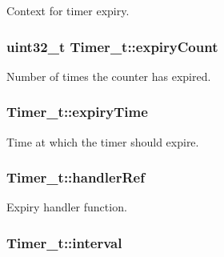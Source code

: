 Context for timer expiry. 

\subsubsection[{\texorpdfstring{expiry\+Count}{expiryCount}}]{\setlength{\rightskip}{0pt plus 5cm}uint32\+\_\+t Timer\+\_\+t\+::expiry\+Count}\hypertarget{struct_timer__t_abf372745a814acf0aaa7ad066617daac}{}\label{struct_timer__t_abf372745a814acf0aaa7ad066617daac}


Number of times the counter has expired. 

\subsubsection[{\texorpdfstring{expiry\+Time}{expiryTime}}]{ Timer\+\_\+t\+::expiry\+Time}\hypertarget{struct_timer__t_a69c227080ba546fd26bceef8977ec050}{}\label{struct_timer__t_a69c227080ba546fd26bceef8977ec050}


Time at which the timer should expire. 

\subsubsection[{\texorpdfstring{handler\+Ref}{handlerRef}}]{ Timer\+\_\+t\+::handler\+Ref}\hypertarget{struct_timer__t_aba3262b93cf1c2493362ffcb6d04d0d5}{}\label{struct_timer__t_aba3262b93cf1c2493362ffcb6d04d0d5}


Expiry handler function. 

\subsubsection[{\texorpdfstring{interval}{interval}}]{ Timer\+\_\+t\+::interval}\hypertarget{struct_timer__t_a05056a263e574c85a22f4df9f777c095}{}\label{struct_timer__t_a05056a263e574c85a22f4df9f777c095}


